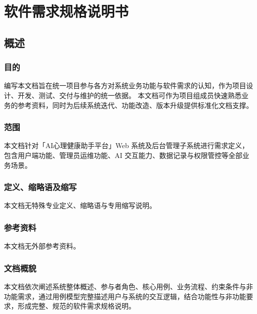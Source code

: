 
\clearpage

\renewcommand{\thesection}{\arabic{section}}
\renewcommand{\thesubsection}{\thesection.\arabic{subsection}}
\renewcommand{\thesubsubsection}{\thesubsection.\arabic{subsubsection}}

\setcounter{tocdepth}{3}
\setcounter{secnumdepth}{3}

\tableofcontents
\newpage

\chapter{软件需求规格说明书}

\section{概述}
\subsection{目的}
编写本文档旨在统一项目参与各方对系统业务功能与软件需求的认知，作为项目设计、开发、测试、交付与维护的统一依据。
本文档可作为项目组成员快速熟悉业务的参考资料，同时为后续系统迭代、功能改造、版本升级提供标准化文档支撑。

\subsection{范围}
本文档针对「AI心理健康助手平台」Web 系统及后台管理子系统进行需求定义，包含用户端功能、管理员运维功能、AI 交互能力、数据记录与权限管控等全部业务场景。

\subsection{定义、缩略语及缩写}
本文档无特殊专业定义、缩略语与专用缩写说明。

\subsection{参考资料}
本文档无外部参考资料。

\subsection{文档概貌}
本文档依次阐述系统整体概述、参与者角色、核心用例、业务流程、约束条件与非功能需求，通过用例模型完整描述用户与系统的交互逻辑，结合功能性与非功能要求，形成完整、规范的软件需求规格说明。

